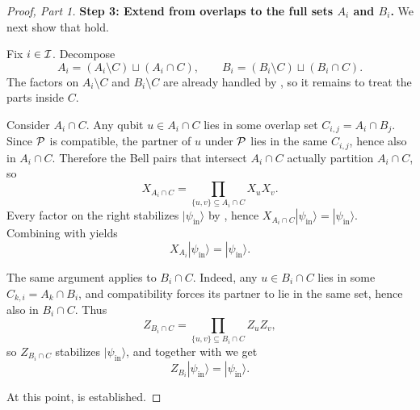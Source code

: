 \begin{proof}[Proof, Part 1]
\medskip
\noindent
\textbf{Step 3: Extend from overlaps to the full sets $A_i$ and $B_i$.}
We next show that  hold.

Fix $i\in\mathcal{I}$.
Decompose
\[
A_i=(A_i\setminus C)\sqcup(A_i\cap C),
\qquad
B_i=(B_i\setminus C)\sqcup(B_i\cap C).
\]
The factors on $A_i\setminus C$ and $B_i\setminus C$ are already handled by
, so it remains to treat the parts inside $C$.

Consider $A_i\cap C$.
Any qubit $u\in A_i\cap C$ lies in some overlap set
$C_{i,j}=A_i\cap B_j$.
Since $\mathcal{P}$ is compatible, the partner of $u$ under $\mathcal{P}$ lies in the same
$C_{i,j}$, hence also in $A_i\cap C$.
Therefore the Bell pairs that intersect $A_i\cap C$ actually partition
$A_i\cap C$, so
\[
X_{A_i\cap C}
=
\prod_{\{u,v\}\subseteq A_i\cap C} X_uX_v.
\]
Every factor on the right stabilizes $|\psi_{\mathrm{in}}\rangle$ by
, hence
$X_{A_i\cap C}|\psi_{\mathrm{in}}\rangle=|\psi_{\mathrm{in}}\rangle$.
Combining with  yields
\begin{equation}
X_{A_i}|\psi_{\mathrm{in}}\rangle = |\psi_{\mathrm{in}}\rangle.
\label{eq:Ai-stab-app}
\end{equation}

The same argument applies to $B_i\cap C$.
Indeed, any $u\in B_i\cap C$ lies in some $C_{k,i}=A_k\cap B_i$, and
compatibility forces its partner to lie in the same set, hence also in
$B_i\cap C$.
Thus
\[
Z_{B_i\cap C}
=
\prod_{\{u,v\}\subseteq B_i\cap C} Z_uZ_v,
\]
so $Z_{B_i\cap C}$ stabilizes $|\psi_{\mathrm{in}}\rangle$, and together with
 we get
\begin{equation}
Z_{B_i}|\psi_{\mathrm{in}}\rangle = |\psi_{\mathrm{in}}\rangle.
\label{eq:Bi-stab-app}
\end{equation}

At this point,  is established.
\medskip
\noindent
\end{proof}

